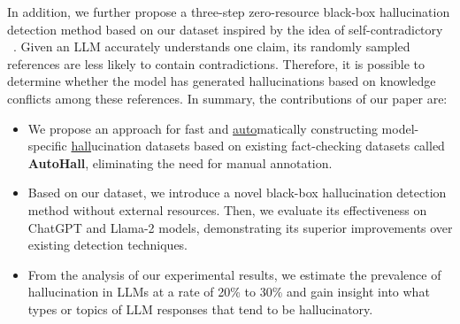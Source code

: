 In addition, we further propose a three-step zero-resource black-box hallucination detection method based on our dataset inspired by the idea of self-contradictory ~\citep{wang2022self,mundler2023self,selfcheckgpt}. Given an LLM accurately understands one claim, its randomly sampled references are less likely to contain contradictions. Therefore, it is possible to determine whether the model has generated hallucinations based on knowledge conflicts among these references. In summary, the contributions of our paper are: 




\begin{itemize}
\item We propose an approach for fast and \underline{auto}matically constructing model-specific \underline{hall}ucination datasets based on existing fact-checking datasets called \textbf{AutoHall}, eliminating the need for manual annotation.

\item Based on our dataset, we introduce a novel black-box hallucination detection method without external resources. Then, we evaluate its effectiveness on ChatGPT and Llama-2 models, demonstrating its superior improvements over existing detection techniques.
\item From the analysis of our experimental results, we estimate the prevalence of hallucination in LLMs at a rate of 20\% to 30\% and gain insight into what types or topics of LLM responses that tend to be hallucinatory.


\end{itemize}
